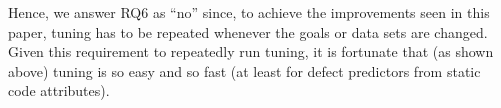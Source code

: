 \documentclass{sig-alternative}
\begin{document}
Hence, we answer RQ6 as ``no'' since, to achieve the improvements seen in this paper, tuning has to be repeated whenever the goals or data
sets are changed. Given this requirement to repeatedly run tuning, it is fortunate that (as shown above)
tuning is so easy and so fast (at least for defect predictors from static code attributes).


 
 
\end{document}
